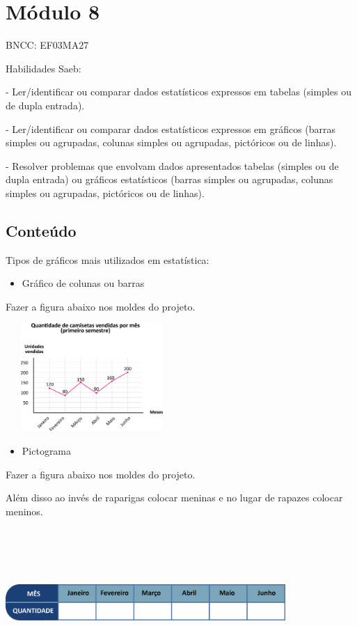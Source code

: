\section{Módulo 8}\label{muxf3dulo-8}

BNCC: EF03MA27

Habilidades Saeb:

- Ler/identificar ou comparar dados estatísticos expressos em tabelas
(simples ou de dupla entrada).

- Ler/identificar ou comparar dados estatísticos expressos em gráficos
(barras simples ou agrupadas, colunas simples ou agrupadas, pictóricos
ou de linhas).

- Resolver problemas que envolvam dados apresentados tabelas (simples ou
de dupla entrada) ou gráficos estatísticos (barras simples ou agrupadas,
colunas simples ou agrupadas, pictóricos ou de linhas).

\subsection{Conteúdo}\label{conteuxfado-7}

Tipos de gráficos mais utilizados em estatística:

\begin{itemize}
\item
  Gráfico de colunas ou barras
\end{itemize}

Fazer a figura abaixo nos moldes do projeto.

\includegraphics[width=2.58333in,height=1.61458in]{media/image88.png}

\begin{itemize}
\item
  Pictograma
\end{itemize}

Fazer a figura abaixo nos moldes do projeto.

Além disso ao invés de raparigas colocar meninas e no lugar de rapazes
colocar meninos.

\includegraphics[width=4.18370in,height=2.21686in]{media/image89.png}

